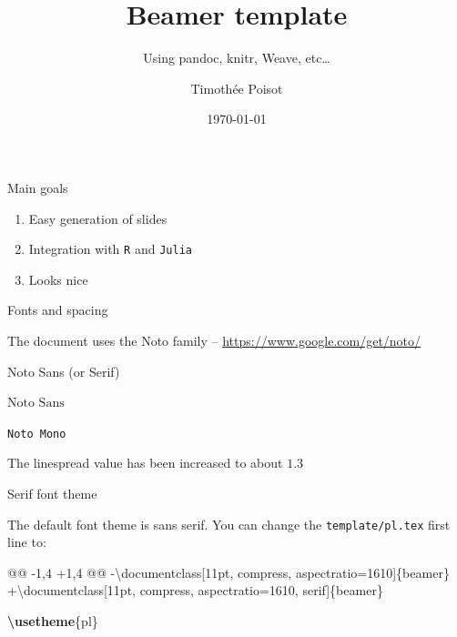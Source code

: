\documentclass[12pt, compress, aspectratio=1610]{beamer}
\title{Beamer template}
\subtitle{Using pandoc, knitr, Weave, etc\ldots{}}
\date{\today}
\author{Timothée Poisot}
\institute{Université de Montréal}
\newenvironment{Shaded}{\begin{mdframed}}{\end{mdframed}}
\newcommand{\FunctionTok}[1]{\textcolor[HTML]{26A69A}{\textbf{{#1}}}}
\newcommand{\BuiltInTok}[1]{\textcolor[HTML]{42A5F5}{{#1}}}
\newcommand{\ExtensionTok}[1]{\textcolor[rgb]{0.74,0.68,0.62}{{#1}}}
\newcommand{\NormalTok}[1]{\textcolor[HTML]{212121}{{#1}}}
\providecommand{\tightlist}{%
  \setlength{\itemsep}{0pt}\setlength{\parskip}{0pt}}
\let\OldTexttt\texttt
\renewcommand{\texttt}[1]{\OldTexttt{\color{plTT}#1}}
\begin{document}
\maketitle

\begin{frame}[fragile]{Main goals}

\begin{enumerate}
\def\labelenumi{\arabic{enumi}.}
\tightlist
\item
  Easy generation of slides
\item
  Integration with \texttt{R} and \texttt{Julia}
\item
  Looks nice
\end{enumerate}

\end{frame}

\begin{frame}[fragile]{Fonts and spacing}

The document uses the \alert{Noto} family --
\url{https://www.google.com/get/noto/}

\begin{description}
\tightlist
\item[Main body]
Noto Sans (or Serif)
\item[Maths]
\(\text{Noto Sans}\)
\item[Code]
\texttt{Noto\ Mono}
\end{description}

The linespread value has been increased to about \(1.3\)

\end{frame}

\begin{frame}[fragile]{Serif font theme}

The default font theme is sans serif. You can change the
\texttt{template/pl.tex} first line to:

\begin{Shaded}
\begin{Highlighting}[]
\NormalTok{@@ -1,4 +1,4 @@}
\NormalTok{-}\BuiltInTok{\textbackslash{}documentclass}\NormalTok{[11pt, compress, aspectratio=1610]\{}\ExtensionTok{beamer}\NormalTok{\}}
\NormalTok{+}\BuiltInTok{\textbackslash{}documentclass}\NormalTok{[11pt, compress, aspectratio=1610, serif]\{}\ExtensionTok{beamer}\NormalTok{\}}

\FunctionTok{\textbackslash{}usetheme}\NormalTok{\{pl\}}
\end{Highlighting}
\end{Shaded}

\end{frame}
\end{document}
